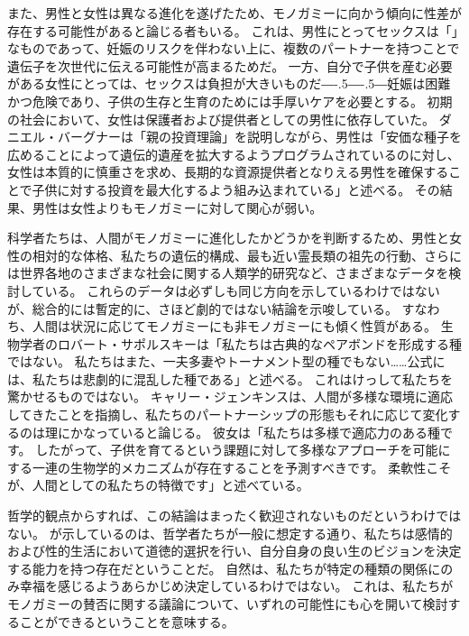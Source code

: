 \documentclass[paper=a4,book,openany]{jlreq}
\def\DDASH{―\kern-.5\zw―\kern-.5\zw―}
\begin{document}
また、男性と女性は異なる進化を遂げたため、モノガミーに向かう傾向に性差が存在する可能性があると論じる者もいる。
これは、男性にとってセックスは「」なものであって、妊娠のリスクを伴わない上に、複数のパートナーを持つことで遺伝子を次世代に伝える可能性が高まるためだ。
一方、自分で子供を産む必要がある女性にとっては、セックスは負担が大きいものだ{\DDASH}妊娠は困難かつ危険であり、子供の生存と生育のためには手厚いケアを必要とする。
初期の社会において、女性は保護者および提供者としての男性に依存していた。
ダニエル・バーグナーは「親の投資理論」を説明しながら、男性は「安価な種子を広めることによって遺伝的遺産を拡大するようプログラムされているのに対し、女性は本質的に慎重さを求め、長期的な資源提供者となりえる男性を確保することで子供に対する投資を最大化するよう組み込まれている」と述べる\citep{bergner13:_unexc}。
その結果、男性は女性よりもモノガミーに対して関心が弱い。

科学者たちは、人間がモノガミーに進化したかどうかを判断するため、男性と女性の相対的な体格、私たちの遺伝的構成、最も近い霊長類の祖先の行動、さらには世界各地のさまざまな社会に関する人類学的研究など、さまざまなデータを検討している。
これらのデータは必ずしも同じ方向を示しているわけではないが、総合的には暫定的に、さほど劇的ではない結論を示唆している。
すなわち、人間は状況に応じてモノガミーにも非モノガミーにも傾く性質がある。
生物学者のロバート・サポルスキーは「私たちは古典的なペアボンドを形成する種ではない。
私たちはまた、一夫多妻やトーナメント型の種でもない……公式には、私たちは悲劇的に混乱した種である」と述べる\citep{sapolsky25:_biolog_human_behav}。
これはけっして私たちを驚かせるものではない。
キャリー・ジェンキンスは、人間が多様な環境に適応してきたことを指摘し、私たちのパートナーシップの形態もそれに応じて変化するのは理にかなっていると論じる。
彼女は「私たちは多様で適応力のある種です。
したがって、子供を育てるという課題に対して多様なアプローチを可能にする一連の生物学的メカニズムが存在することを予測すべきです。
柔軟性こそが、人間としての私たちの特徴です」と述べている\citep{dominus17:_is_open_marriag_happier_marriag}。

哲学的観点からすれば、この結論はまったく歓迎されないものだというわけではない。
が示しているのは、哲学者たちが一般に想定する通り、私たちは感情的および性的生活において道徳的選択を行い、自分自身の良い生のビジョンを決定する能力を持つ存在だということだ。
自然は、私たちが特定の種類の関係にのみ幸福を感じるようあらかじめ決定しているわけではない。
これは、私たちがモノガミーの賛否に関する議論について、いずれの可能性にも心を開いて検討することができるということを意味する。
\end{document}

